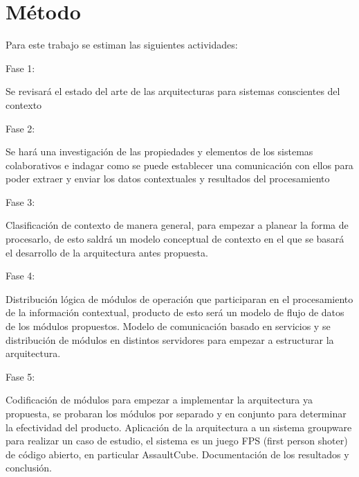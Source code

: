 \section{M\'etodo}
Para este trabajo se estiman las siguientes actividades:

Fase 1:

Se revisar\'a el estado del arte de las arquitecturas para sistemas conscientes del contexto

Fase 2:

Se har\'a una investigaci\'on de las propiedades y elementos de los sistemas colaborativos e indagar como se puede establecer una comunicaci\'on con ellos para poder extraer y enviar los datos contextuales y resultados del procesamiento

Fase 3: 

Clasificaci\'on de contexto de manera general, para empezar a planear la forma de procesarlo, de esto saldr\'a un modelo conceptual de contexto en el que se basar\'a el desarrollo de la arquitectura antes propuesta.

Fase 4:

Distribuci\'on l\'ogica de m\'odulos de operaci\'on que participaran en el procesamiento de la informaci\'on contextual, producto de esto ser\'a un modelo de flujo de datos de los m\'odulos propuestos. Modelo de comunicaci\'on basado en servicios y se distribuci\'on de m\'odulos en distintos servidores para empezar a estructurar la arquitectura.

Fase 5:

Codificaci\'on de m\'odulos para empezar a implementar la arquitectura ya propuesta, se probaran los m\'odulos por separado y en conjunto para determinar la efectividad del producto. Aplicaci\'on de la arquitectura a un sistema groupware para realizar un caso de estudio, el sistema es un juego FPS (first person shoter) de c\'odigo abierto, en particular AssaultCube. Documentaci\'on de los resultados y conclusi\'on.
